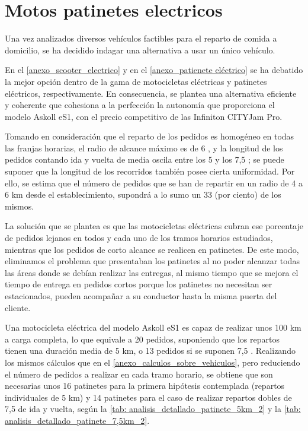 \newpage
\section{Motos patinetes electricos}
\label{anexo_motos_patinetes_electricos}

Una vez analizados diversos vehículos factibles para el reparto de comida a domicilio, se ha decidido indagar una alternativa a usar un único vehículo.

En el \autoref{anexo_scooter_electrico} y en el \autoref{anexo_patienete eléctrico} se ha debatido la mejor opción dentro de la gama de motocicletas eléctricas y patinetes eléctricos, respectivamente. En consecuencia, se plantea una alternativa eficiente y coherente que cohesiona a la perfección la autonomía que proporciona el modelo Askoll eS1, con el precio competitivo de las Infiniton CITYJam Pro.

Tomando en consideración que el reparto de los pedidos es homogéneo en todas las franjas horarias, el radio de alcance máximo es de 6 , y la longitud de los pedidos contando ida y vuelta de media oscila entre los 5 y los 7,5 ; se puede suponer que la longitud de los recorridos también posee cierta uniformidad. Por ello, se estima que el número de pedidos que se han de repartir en un radio de 4 a 6 km desde el establecimiento, supondrá a lo sumo un 33 (por ciento) de los mismos.

La solución que se plantea es que las motocicletas eléctricas cubran ese porcentaje de pedidos lejanos en todos y cada uno de los tramos horarios estudiados, mientras que los pedidos de corto alcance se realicen en patinetes. De este modo, eliminamos el problema que presentaban los patinetes al no poder alcanzar todas las áreas donde se debían realizar las entregas, al mismo tiempo que se mejora el tiempo de entrega en pedidos cortos porque los patinetes no necesitan ser estacionados, pueden acompañar a su conductor hasta la misma puerta del cliente.

Una motocicleta eléctrica del modelo Askoll eS1 es capaz de realizar unos 100 km a carga completa, lo que equivale a 20 pedidos, suponiendo que los repartos tienen una duración media de 5 km, o 13 pedidos si se suponen 7,5 . Realizando los mismos cálculos que en el \autoref{anexo_calculos_sobre_vehiculos}, pero reduciendo el número de pedidos a realizar en cada tramo horario, se obtiene que son necesarias unos 16 patinetes para la primera hipótesis contemplada (repartos individuales de 5 km) y 14 patinetes para el caso de realizar repartos dobles de 7,5  de ida y vuelta, según la \autoref{tab: analisis_detallado_patinete_5km_2} y la \autoref{tab: analisis_detallado_patinete_7,5km_2}.

